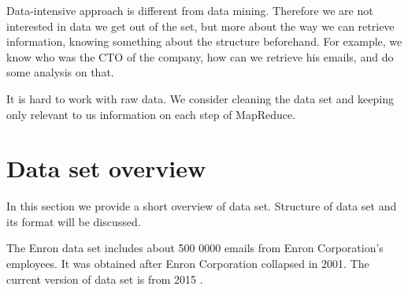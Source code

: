 \documentclass{llncs}
\begin{document}
Data-intensive approach is different from data mining. Therefore we are not interested in data we get out of the set, but more about the way we can retrieve information, knowing something about the structure beforehand. For
example, we know who was the CTO of the company, how can we retrieve his emails, and do some analysis on that.

It is hard to work with raw data. We consider cleaning the data set and keeping only relevant to us information on each step of MapReduce.


\section{Data set overview}
In this section we provide a short overview of data set. Structure of data set and its format will be discussed.

The Enron data set includes about 500 0000 emails from Enron Corporation's employees. It was obtained after Enron Corporation collapsed in 2001. The current version of data set is from 2015 \cite{data set}.
\end{document}

